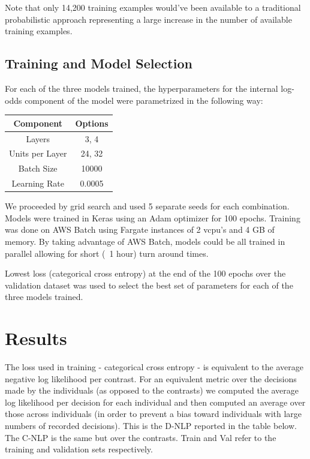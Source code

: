 \documentclass[11pt]{article}
\begin{document}
Note that only 14,200 training examples would've been available to a traditional probabilistic approach representing a large increase in the number of available training examples. 


\subsection*{Training and Model Selection}

For each of the three models trained, the hyperparameters for the internal log-odds component of the model were parametrized in the following way:

\begin{center}
\begin{tabular}{| c | c |} 
\hline 
Component & Options \\
\hline
Layers & 3, 4 \\ 
Units per Layer & 24, 32 \\
Batch Size & 10000 \\
Learning Rate & 0.0005 \\
\hline
\end{tabular}
\end{center}

We proceeded by grid search and used 5 separate seeds for each combination. Models were trained in Keras using an Adam optimizer for 100 epochs. Training was done on AWS Batch using Fargate instances of 2 vcpu's and 4 GB of memory. By taking advantage of AWS Batch,  models could be all trained in parallel allowing for short (~1 hour) turn around times. 

Lowest loss (categorical cross entropy) at the end of the 100 epochs over the validation dataset was used to select the best set of parameters for each of the three models trained.


\section*{Results}

The loss used in training - categorical cross entropy - is equivalent to the average negative log likelihood per contrast. For an equivalent metric over the decisions made by the individuals (as opposed to the contrasts) we computed the average log likelihood per decision for each individual and then computed an average over those across individuals (in order to prevent a bias toward individuals with large numbers of recorded decisions). This is the D-NLP reported in the table below. The C-NLP is the same but over the contrasts. Train and Val refer to the training and validation sets respectively.
\end{document}
